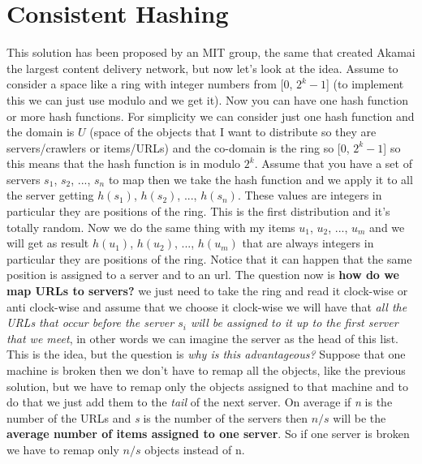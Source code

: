 \section{Consistent Hashing}
This solution has been proposed by an MIT group, the same that created Akamai the largest content delivery network, but now let's look at the idea.\newline
Assume to consider a space like a ring with integer numbers from [0, $2^k-1$] (to implement this we can just use modulo and we get it). Now you can have one hash function or more hash functions. For simplicity we can consider just one hash function and the domain is $U$ (space of the objects that I want to distribute so they are servers/crawlers or items/URLs) and the co-domain is the ring so [0, $2^k-1$] so this means that the hash function is in modulo $2^k$.\newline
Assume that you have a set of servers $s_1$, $s_2$, ..., $s_n$ to map then we take the hash function and we apply it to all the server getting $h(s_1)$, $h(s_2)$, ..., $h(s_n)$. These values are integers in particular they are positions of the ring. This is the first distribution and it's totally random. Now we do the same thing with my items $u_1$, $u_2$, ..., $u_m$ and we will get as result $h(u_1)$, $h(u_2)$, ..., $h(u_m)$ that are always integers in particular they are positions of the ring.\newline
Notice that it can happen that the same position is assigned to a server and to an url.\newline
The question now is \textbf{how do we map URLs to servers?} we just need to take the ring and read it clock-wise or anti clock-wise and assume that we choose it clock-wise we will have that \textit{all the URLs that occur before the server $s_i$ will be assigned to it up to the first server that we meet}, in other words we can imagine the server as the head of this list.\newline
This is the idea, but the question is \textit{why is this advantageous?} Suppose that one machine is broken then we don't have to remap all the objects, like the previous solution, but we have to remap only the objects assigned to that machine and to do that we just add them to the \textit{tail} of the next server.\newline
On average if \textit{n} is the number of the URLs and \textit{s} is the number of the servers then $n/s$ will be the \textbf{average number of items assigned to one server}. So if one server is broken we have to remap only $n/s$ objects instead of n.\newline
